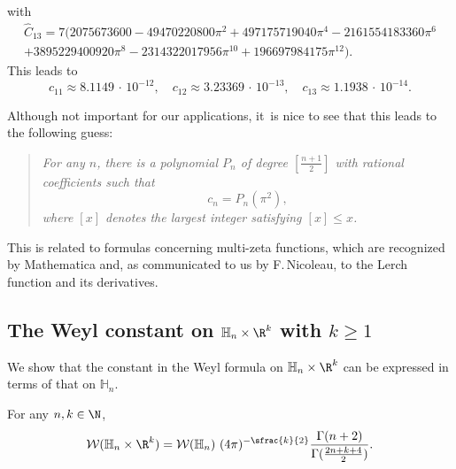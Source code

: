 with
\begin{multline*}
\hat C_{13}= 7 \bigl(2075673600-49470220800 \pi ^2+497175719040 \pi ^4-2161554183360 \pi ^6\\
+3895229400920 \pi ^8-2314322017956 \pi ^{10}+196697984175
\pi ^{12}\bigr).
\end{multline*}
This leads to
\begin{equation*}
c_{11} \approx 8.1149\,\cdot\,10^{-12}, \quad
c_{12} \approx 3.23369\,\cdot\,10^{-13},\quad
c_{13} \approx 1.1938 \,\cdot\,10^{-14}.
\end{equation*}

Although not important for our applications, it~is nice to see that this leads to the following guess:
\begin{quotation}
{\it
For any $n$, there is a polynomial $P_n$ of degree $[\frac {n+1} 2]$ with rational coefficients such that
\[
c_n= P_n(\pi^2),
\]
where $ [x]$ denotes the largest integer satisfying $[x]\leq x$.
}
\end{quotation}
This is related to formulas concerning multi-zeta functions, which are recognized by Mathematica and, as communicated to us by F.\,Nicoleau, to the Lerch function \cite[p.\,32]{MOS} and its derivatives.

\subsection{The Weyl constant on $\mathbb H_n\times\R^k$ with $k\geq 1$}
We show that the constant in the Weyl formula on $\mathbb H_n\times\R^k$ can be expressed in terms of that on $\mathbb H_n$.

\begin{lemma}\label{wnk}
For any $n,k\in\N$,\vspace*{-3pt}
\begin{equation}
\label{eq:wnk}
\mathcal W(\mathbb H_n\times\R^k) = \mathcal W(\mathbb H_n)\ (4\pi)^{-\sfrac{k}{2}} \frac{\Gamma(n+2)}{\Gamma(\frac{2n+k+4}{2})}.
\end{equation}
\end{lemma}

